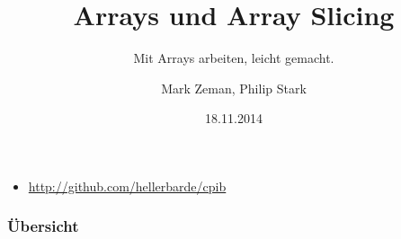 \documentclass[t]{beamer}
\title{Arrays und Array Slicing}
\subtitle{Mit Arrays arbeiten, leicht gemacht.}
\author{Mark Zeman, Philip Stark}
\institute{FHNW - Compilerbau}
\date{18.11.2014}
\begin{document}
\begin{frame}
\titlepage
\begin{itemize}
\item 	\url{http://github.com/hellerbarde/cpib}
\end{itemize}
\end{frame}

\begin{frame}
\frametitle{Übersicht}
\tableofcontents
\end{frame}


\end{document}
